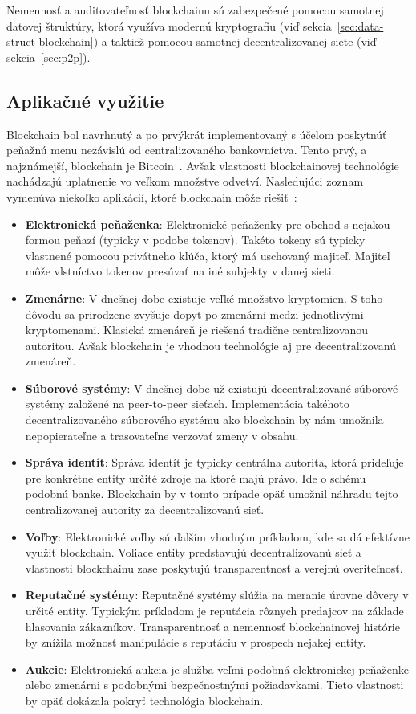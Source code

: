 Nemennosť a auditovateľnosť blockchainu sú zabezpečené pomocou samotnej datovej štruktúry, ktorá využíva modernú kryptografiu (viď sekcia~\ref{sec:data-struct-blockchain}) a taktiež pomocou samotnej decentralizovanej siete (viď sekcia~\ref{sec:p2p}).~\cite{horizenAcademy}

\subsection{Aplikačné využitie}

Blockchain bol navrhnutý a po prvýkrát implementovaný s účelom poskytnúť peňažnú menu nezávislú od centralizovaného bankovníctva. Tento prvý, a najznámejší, blockchain je Bitcoin~\cite{satoshiBitcoin}. Avšak vlastnosti blockchainovej technológie nachádzajú uplatnenie vo veľkom množstve odvetví. Nasledujúci zoznam vymenúva niekoľko aplikácií, ktoré blockchain môže riešiť~\cite{homoliakBlockchain}:

\begin{itemize}
	\item \textbf{Elektronická peňaženka}: Elektronické peňaženky pre obchod s nejakou formou peňazí (typicky v podobe tokenov). Takéto tokeny sú typicky vlastnené pomocou privátneho kľúča, ktorý má uschovaný majiteľ. Majiteľ môže vlstníctvo tokenov presúvať na iné subjekty v danej sieti.
	\item \textbf{Zmenárne}: V dnešnej dobe existuje veľké množstvo kryptomien. S toho dôvodu sa prirodzene zvyšuje dopyt po zmenárni medzi jednotlivými kryptomenami. Klasická zmenáreň je riešená tradične centralizovanou autoritou. Avšak blockchain je vhodnou technológie aj pre decentralizovanú zmenáreň.
	\item \textbf{Súborové systémy}: V dnešnej dobe už existujú decentralizované súborové systémy založené na peer-to-peer sieťach. Implementácia takéhoto decentralizovaného súborového systému ako blockchain by nám umožnila nepopierateľne a trasovateľne verzovať zmeny v obsahu.
	\item \textbf{Správa identít}: Správa identít je typicky centrálna autorita, ktorá prideľuje pre konkrétne entity určité zdroje na ktoré majú právo. Ide o schému podobnú banke. Blockchain by v tomto prípade opäť umožnil náhradu tejto centralizovanej autority za decentralizovanú sieť.
	\item \textbf{Voľby}: Elektronické voľby sú ďalším vhodným príkladom, kde sa dá efektívne využiť blockchain. Voliace entity predstavujú decentralizovanú sieť a vlastnosti blockchainu zase poskytujú transparentnosť a verejnú overiteľnosť.
	\item \textbf{Reputačné systémy}: Reputačné systémy slúžia na meranie úrovne dôvery v určité entity. Typickým príkladom je reputácia rôznych predajcov na základe hlasovania zákazníkov. Transparentnosť a nemennosť blockchainovej histórie by znížila možnosť manipulácie s reputáciu v prospech nejakej entity.
	\item \textbf{Aukcie}: Elektronická aukcia je služba veľmi podobná elektronickej peňaženke alebo zmenárni s podobnými bezpečnostnými požiadavkami. Tieto vlastnosti by opäť dokázala pokryť technológia blockchain.
\end{itemize}

